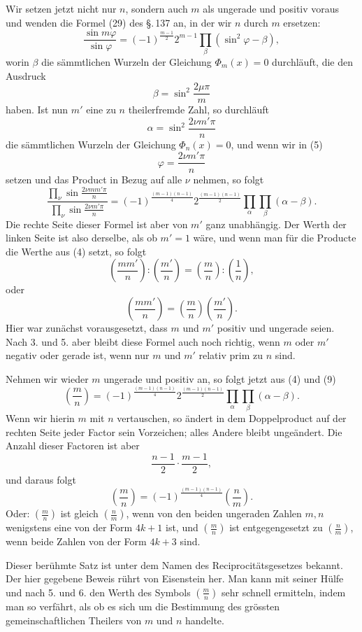 \documentclass[11pt]{article}
\begin{document}
Wir setzen jetzt nicht nur $n$, sondern auch $m$ als ungerade und positiv voraus und wenden die Formel (29) des §.\,137 an, in der wir $n$ durch $m$ ersetzen:
\[
\tag{5}
\frac{\sin m\varphi}{\sin\varphi}
=(-1)^{\frac{m-1}{2}}2^{m-1}\prod_\beta(\sin^2\varphi-\beta),
\]
worin $\beta$ die sämmtlichen Wurzeln der Gleichung $\Phi_m(x)=0$ durchläuft, die den Ausdruck
\[
\tag{6}
        \beta=\sin^2\frac{2\mu\pi}{m}
\]
haben. Ist nun $m'$ eine zu $n$ theilerfremde Zahl, so durchläuft
\[
\tag{7}
        \alpha=\sin^2\frac{2\nu m'\pi}{n}
\]
die sämmtlichen Wurzeln der Gleichung $\Phi_n(x)=0$, und wenn wir in (5)
\[
\tag{8}
        \varphi=\frac{2\nu m'\pi}{n}
\]
setzen und das Product in Bezug auf alle $\nu$ nehmen, so folgt
\[
\tag{9}
\frac{\prod_\nu \sin\frac{2\nu m m'\pi}{n}}
     {\prod_\nu \sin\frac{2\nu m'\pi}{n}}
=(-1)^{\frac{(m-1)(n-1)}4}
2^{\frac{(m-1)(n-1)}2}\prod_\alpha\prod_\beta(\alpha-\beta).
\]
Die rechte Seite dieser Formel ist aber von $m'$ ganz unabhängig. Der Werth der linken Seite ist also derselbe, als ob $m'=1$ wäre, und wenn man für die Producte die Werthe aus (4) setzt, so folgt
\[
        \left(\frac{mm'}n\right):\left(\frac{m'}n\right)
        =
        \left(\frac mn\right):\left(\frac 1n\right),
\]
oder
\[
        \left(\frac{mm'}n\right)=
        \left(\frac mn\right)\left(\frac{m'}n\right).
\]
Hier war zunächst vorausgesetzt, dass $m$ und $m'$ positiv und ungerade seien. Nach 3. und 5. aber bleibt diese Formel auch noch richtig, wenn $m$ oder $m'$ negativ oder gerade ist, wenn nur $m$ und $m'$ relativ prim zu $n$ sind.

Nehmen wir wieder $m$ ungerade und positiv an, so folgt jetzt aus (4) und (9)
\[
\tag{10}
\left(\frac mn\right)
=(-1)^{\frac{(m-1)(n-1)}4}
2^{\frac{(m-1)(n-1)}2}\prod_\alpha\prod_\beta(\alpha-\beta).
\]
Wenn wir hierin $m$ mit $n$ vertauschen, so ändert in dem Doppelproduct auf der rechten Seite jeder Factor sein Vorzeichen; alles Andere bleibt ungeändert. Die Anzahl dieser Factoren ist aber
\[
        \frac{n-1}{2}\cdot\frac{m-1}{2},
\]
und daraus folgt
\[
\tag{9'}
        \left(\frac mn\right)
        =(-1)^{\frac{(m-1)(n-1)}4}\left(\frac nm\right).
\]
Oder: $\left(\frac mn\right)$ ist gleich $\left(\frac nm\right)$, wenn von den beiden ungeraden Zahlen $m,n$ wenigstens eine von der Form $4k+1$ ist, und $\left(\frac mn\right)$ ist entgegengesetzt zu $\left(\frac nm\right)$, wenn beide Zahlen von der Form $4k+3$ sind.

Dieser berühmte Satz ist unter dem Namen des Reciprocitätsgesetzes bekannt. Der hier gegebene Beweis rührt von Eisenstein her. Man kann mit seiner Hülfe und nach 5. und 6. den Werth des Symbols $\left(\frac mn\right)$ sehr schnell ermitteln, indem man so verfährt, als ob es sich um die Bestimmung des grössten gemeinschaftlichen Theilers von $m$ und $n$ handelte.
\end{document}
